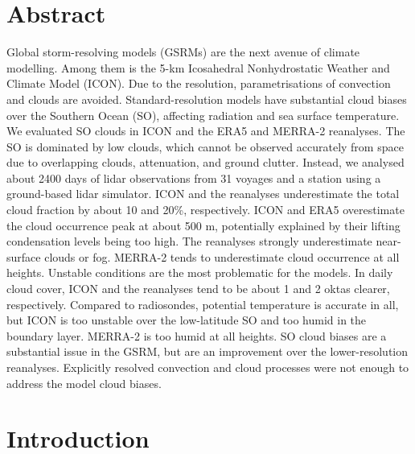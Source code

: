 \documentclass[12pt,a4paper]{article}
\begin{document}
\section*{Abstract}

Global storm-resolving models (GSRMs) are the next avenue of climate modelling.
Among them is the 5-km Icosahedral Nonhydrostatic Weather and Climate Model
(ICON). Due to the resolution, parametrisations of convection and clouds are
avoided. Standard-resolution models have substantial cloud biases over the
Southern Ocean (SO), affecting radiation and sea surface temperature.  We
evaluated SO clouds in ICON and the ERA5 and MERRA-2 reanalyses.  The SO is
dominated by low clouds, which cannot be observed accurately from space due to
overlapping clouds, attenuation, and ground clutter.  Instead, we analysed
about 2400 days of lidar observations from 31 voyages and a station using a
ground-based lidar simulator.  ICON and the reanalyses underestimate the total
cloud fraction by about 10 and 20\%, respectively. ICON and ERA5 overestimate
the cloud occurrence peak at about 500 m, potentially explained by their
lifting condensation levels being too high.  The reanalyses strongly
underestimate near-surface clouds or fog.  MERRA-2 tends to underestimate cloud
occurrence at all heights. Unstable conditions are the most problematic for the
models. In daily cloud cover, ICON and the reanalyses tend to be about 1 and 2
oktas clearer, respectively. Compared to radiosondes, potential temperature is
accurate in all, but ICON is too unstable over the low-latitude SO and too humid in
the boundary layer. MERRA-2 is too humid at all heights. SO cloud biases are a
substantial issue in the GSRM, but are an improvement over the
lower-resolution reanalyses. Explicitly resolved convection and cloud processes
were not enough to address the model cloud biases.

\section{Introduction}
\label{sec:introduction}
\end{document}

